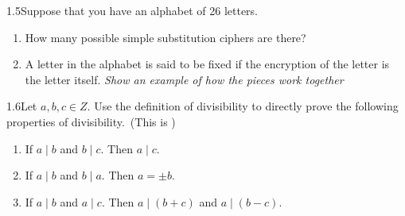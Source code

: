 \begin{exercise}
    {1.5}Suppose that you have an alphabet of 26 letters.
    \begin{enumerate}
        \item How many possible simple substitution ciphers are there?
        \item A letter in the alphabet is said to be fixed if the encryption of the letter is the letter itself. \textit{Show an example of how the pieces work together}
    \end{enumerate}
\end{exercise}


\begin{exercise}
    {1.6}Let \(a, b, c \in Z\). Use the definition of divisibility to directly prove the following properties of divisibility.\ (This is )
    \begin{enumerate}
        \item If \(a \mid b\) and \(b \mid c\). Then \(a \mid c\).
        \item If \(a \mid b\) and \(b \mid a\). Then \(a = \pm b\).
        \item If \(a \mid b\) and \(a \mid c\). Then \(a \mid (b + c)\) and \(a \mid (b - c)\).
    \end{enumerate}
\end{exercise}

